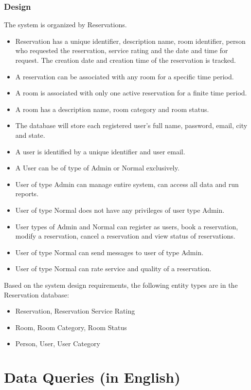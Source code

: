 \documentclass[11pt]{report}
\begin{document}
\subsubsection{Design}
The system is organized by Reservations. 
\begin{itemize}
\item Reservation has a unique identifier, description name, room identifier, person who requested the reservation, service rating and the date and time for request. The creation date and creation time of the reservation is tracked. \item A reservation can be associated with any room for a specific time period.
\item A room is associated with only one active reservation for a finite time period.
\item A room has a description name, room category and room status.
\item The database will store each registered user's full name, password, email, city and state.
\item A user is identified by a unique identifier and user email.
\item A User can be of type of Admin or Normal exclusively.
\item User of type Admin can manage entire system, can access all data and run reports.
\item User of type Normal does not have any privileges of user type Admin.
\item User types of Admin and Normal can register as users, book a reservation, modify a reservation, cancel a reservation and view status of reservations.
\item User of type Normal can send messages to user of type Admin.
\item User of type Normal can rate service and quality of a reservation.
\end{itemize}

Based on the system design requirements, the following entity types are in the Reservation database:
\begin{itemize}
    \item Reservation,  Reservation Service Rating
    \item Room, Room Category, Room Status
    \item Person, User, User Category
\end{itemize}

\section*{Data Queries (in English)}
\end{document}
